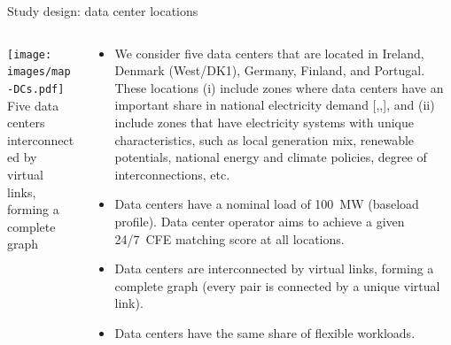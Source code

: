 \begin{frame}{Study design: data center locations}
  
  {\footnotesize
  \begin{columns}[T]

  \begin{column}{7cm}
  \centering
  \vspace{0.5cm}
  \texttt{[image: images/map-DCs.pdf]}
  {\scriptsize Five data centers interconnected by virtual links, \\ 
  forming a complete graph}
  \end{column}

  \begin{column}{8cm}
  \begin{itemize}
    \item We consider \alert{five data centers} that are located in Ireland, Denmark (West/DK1), Germany, Finland, and Portugal. These locations (i) include zones where data centers have an important share in national electricity demand [,,], and (ii) include zones that have electricity systems with unique characteristics, such as local generation mix, renewable potentials, national energy and climate policies, degree of interconnections, etc. 
    \item Data centers have a nominal load of \alert{100~MW} (baseload profile). Data center operator aims to achieve a given 24/7~CFE matching score \alert{at all locations}. 
    \item Data centers are interconnected by virtual links, forming a \alert{complete graph} (every pair is connected by a unique virtual link).
    \item Data centers have the \alert{same share of flexible workloads}. 
  \end{itemize}

  \end{column}
  \end{columns}
  }

\end{frame}



